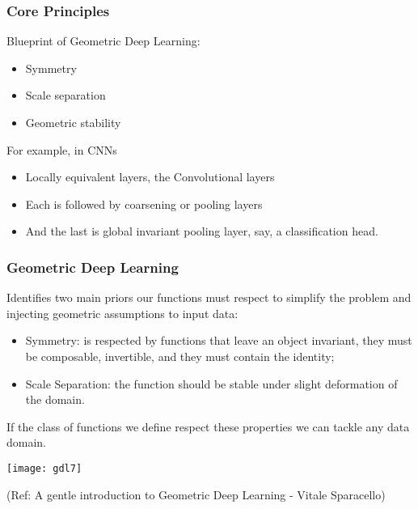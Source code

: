 \begin{frame}[fragile]\frametitle{Core Principles}
Blueprint of Geometric Deep Learning:
\begin{itemize}
\item Symmetry
\item Scale separation
\item Geometric stability
\end{itemize}

For example, in CNNs
\begin{itemize}
\item Locally equivalent layers, the Convolutional layers
\item Each is followed by coarsening or pooling layers
\item And the last is global invariant pooling layer, say, a classification head.
\end{itemize}
	
\end{frame}

\begin{frame}[fragile]\frametitle{Geometric Deep Learning}

Identifies two main priors our functions must respect to simplify the problem and injecting geometric assumptions to input data:

\begin{itemize}
\item Symmetry: is respected by functions that leave an object invariant, they must be composable, invertible, and they must contain the identity;
\item Scale Separation: the function should be stable under slight deformation of the domain.
\end{itemize}
	
	 If the class of functions we define respect these properties we can tackle any data domain.
	 
\begin{center}
\texttt{[image: gdl7]}
\end{center}

{\tiny (Ref: A gentle introduction to Geometric Deep Learning - Vitale Sparacello)}	
\end{frame}


